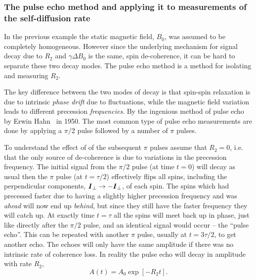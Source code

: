 \documentclass[11pt,a4paper, twocolumn,
swedish, english %
]{article}
\begin{document}
\subsubsection{The pulse echo method and applying it to
measurements of the self-diffusion rate} 

In the previous example the static magnetic field, $B_0$, was assumed
to be completely homogeneous. However since the underlying mechanism
for signal decay due to $R_2$ and $\gamma\Delta B_0$ is the same, spin
de-coherence, it can be hard to separate these two decay modes. The
pulse echo method is a method for isolating  and measuring $R_2$. 

The key difference between the two modes of decay is that spin-spin
relaxation is due to intrinsic \emph{phase drift} due to fluctuations,
while the magnetic field variation leads to different precession
\emph{frequencies}. By the ingenious method of pulse echo by Erwin
Hahn~\cite{Hahn1950} in 1950. The most common type of pulse echo
measurements are done by applying a $\pi/2$ pulse followed by a number
of $\pi$ pulses.

To understand the effect of of the subsequent $\pi$ pulses assume that
$R_2=0$, i.e. that the only source of de-coherence is due to
variations in the precession frequency. The initial signal from the
$\pi/2$ pulse (at time $t=0$) will decay as usual then the $\pi$ pulse
(at $t=\tau/2$) effectively flips all spins, including the
perpendicular components, $\vb*I_\perp\to-\vb*I_\perp$, of each
spin. The spins which had precessed faster due to having a slightly
higher precession frequency and was \emph{ahead} will now end up
\emph{behind}, but since they still have the faster frequency they
will catch up. At exactly time $t=\tau$ all the spins will meet
back up in phase, just like directly after the $\pi/2$ pulse, and an
identical signal would occur -- the ``pulse echo''. This can be
repeated with another $\pi$ pulse, usually at $t=3\tau/2$, to get
another echo. The echoes will only have the same amplitude if there
was no intrinsic rate of coherence loss. In reality the pulse echo
will decay in amplitude with rate $R_2$,
\begin{equation}
A(t)=A_0\exp[-R_2t].
\end{equation}
\end{document}
